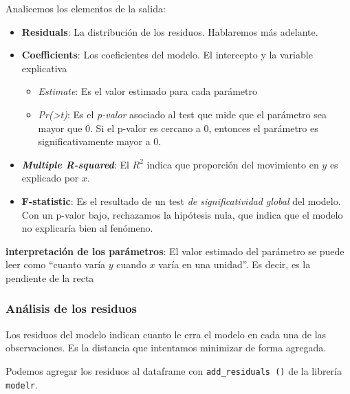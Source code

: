 \documentclass[]{book}
\newenvironment{Shaded}{\begin{snugshade}}{\end{snugshade}}
\newcommand{\DecValTok}[1]{\textcolor[rgb]{0.00,0.00,0.81}{#1}}
\newcommand{\KeywordTok}[1]{\textcolor[rgb]{0.13,0.29,0.53}{\textbf{#1}}}
\newcommand{\NormalTok}[1]{#1}
\newcommand{\OperatorTok}[1]{\textcolor[rgb]{0.81,0.36,0.00}{\textbf{#1}}}
\newcommand{\StringTok}[1]{\textcolor[rgb]{0.31,0.60,0.02}{#1}}
\providecommand{\tightlist}{%
  \setlength{\itemsep}{0pt}\setlength{\parskip}{0pt}}
\begin{document}
Analicemos los elementos de la salida:

\begin{itemize}
\tightlist
\item
  \textbf{Residuals}: La distribución de los residuos. Hablaremos más adelante.
\item
  \textbf{Coefficients}: Los coeficientes del modelo. El intercepto y la variable explicativa

  \begin{itemize}
  \tightlist
  \item
    \emph{Estimate}: Es el valor estimado para cada parámetro
  \item
    \emph{Pr(\textgreater{}\textbar{}t\textbar{})}: Es el \emph{p-valor} asociado al test que mide que el parámetro sea mayor que 0. Si el p-valor es cercano a 0, entonces el parámetro es significativamente mayor a 0.
  \end{itemize}
\item
  \textbf{\emph{Multiple R-squared}}: El \(R^2\) indica que proporción del movimiento en \(y\) es explicado por \(x\).
\item
  \textbf{F-statistic}: Es el resultado de un test \emph{de significatividad global} del modelo. Con un p-valor bajo, rechazamos la hipótesis nula, que indica que el modelo no explicaría bien al fenómeno.
\end{itemize}

\textbf{interpretación de los parámetros}: El valor estimado del parámetro se puede leer como ``cuanto varía \(y\) cuando \(x\) varía en una unidad''. Es decir, es la pendiente de la recta

\hypertarget{analisis-de-los-residuos}{%
\subsubsection{Análisis de los residuos}\label{analisis-de-los-residuos}}

Los residuos del modelo indican cuanto le erra el modelo en cada una de las observaciones. Es la distancia que intentamos minimizar de forma agregada.

Podemos agregar los residuos al dataframe con \texttt{add\_residuals\ ()} de la librería \texttt{modelr}.

\begin{Shaded}
\end{Shaded}
\end{document}
